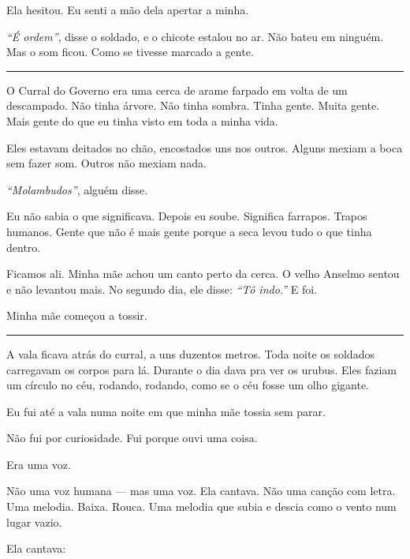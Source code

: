 \noindent Ela hesitou. Eu senti a mão dela apertar a minha.

\noindent \textit{\textquotedblleft{}É ordem\textquotedblright{}}, disse o soldado, e o chicote estalou no ar. Não bateu em ninguém. Mas o som ficou. Como se tivesse marcado a gente.

\vspace{0.5em}\noindent\rule{\textwidth}{0.5pt}\vspace{0.5em}

\noindent O Curral do Governo era uma cerca de arame farpado em volta de um descampado. Não tinha árvore. Não tinha sombra. Tinha gente. Muita gente. Mais gente do que eu tinha visto em toda a minha vida.

\noindent Eles estavam deitados no chão, encostados uns nos outros. Alguns mexiam a boca sem fazer som. Outros não mexiam nada.

\noindent \textit{\textquotedblleft{}Molambudos\textquotedblright{}}, alguém disse.

\noindent Eu não sabia o que significava. Depois eu soube. Significa farrapos. Trapos humanos. Gente que não é mais gente porque a seca levou tudo o que tinha dentro.

\noindent Ficamos ali. Minha mãe achou um canto perto da cerca. O velho Anselmo sentou e não levantou mais. No segundo dia, ele disse: \textit{\textquotedblleft{}Tô indo.\textquotedblright{}} E foi.

\noindent Minha mãe começou a tossir.

\vspace{0.5em}\noindent\rule{\textwidth}{0.5pt}\vspace{0.5em}

\noindent A vala ficava atrás do curral, a uns duzentos metros. Toda noite os soldados carregavam os corpos para lá. Durante o dia dava pra ver os urubus. Eles faziam um círculo no céu, rodando, rodando, como se o céu fosse um olho gigante.

\noindent Eu fui até a vala numa noite em que minha mãe tossia sem parar.

\noindent Não fui por curiosidade.
Fui porque ouvi uma coisa.

\noindent Era uma voz.

\noindent Não uma voz humana --- mas uma voz. Ela cantava. Não uma canção com letra. Uma melodia. Baixa. Rouca. Uma melodia que subia e descia como o vento num lugar vazio.

\noindent Ela cantava:

